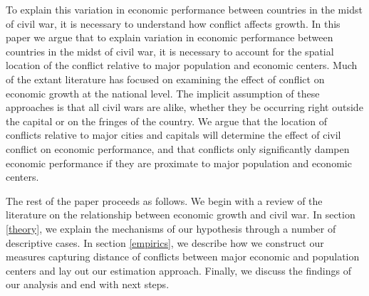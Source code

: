 To explain this variation in economic performance between countries in the midst of civil war, it is necessary to understand how conflict affects growth. In this paper we argue that to explain variation in economic performance between countries in the midst of civil war, it is necessary to account for the spatial location of the conflict relative to major population and economic centers. Much of the extant literature has focused on examining the effect of conflict on economic growth at the national level. The implicit assumption of these approaches is that all civil wars are alike, whether they be occurring right outside the capital or on the fringes of the country. We argue that the location of conflicts relative to major cities and capitals will determine the effect of civil conflict on economic performance, and that conflicts only significantly dampen economic performance if they are proximate to major population and economic centers. 

The rest of the paper proceeds as follows.  We begin with a review of the literature on the relationship between economic growth and civil war. In section \ref{theory}, we explain the mechanisms of our hypothesis through a number of descriptive cases. In section \ref{empirics}, we describe how we construct our measures capturing distance of conflicts between major economic and population centers and lay out our estimation approach. Finally, we discuss the findings of our analysis and end with next steps. 